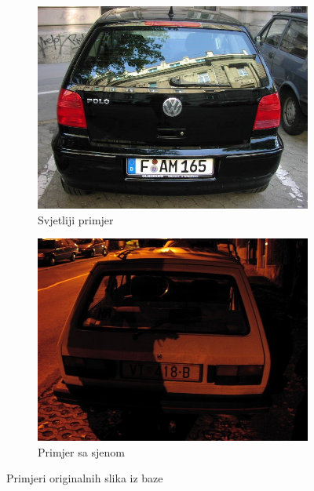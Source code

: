 \documentclass[times, utf8, diplomski]{fer}
\begin{document}
\begin{figure}[H]
     \begin{subfigure}[b]{0.4\textwidth}
         \centering
         \includegraphics[width=\textwidth]{figures/ce_examples/3/original.jpg}
         \caption{Svjetliji primjer}
     \end{subfigure}
     \hspace{1cm}
     \begin{subfigure}[b]{0.4\textwidth}
         \centering
         \includegraphics[width=\textwidth]{figures/ce_examples/4/original.jpg}
         \caption{Primjer sa sjenom}
     \end{subfigure}
        \caption{Primjeri originalnih slika iz baze}
        \label{fig:ce_originals}
\end{figure}
\end{document}
